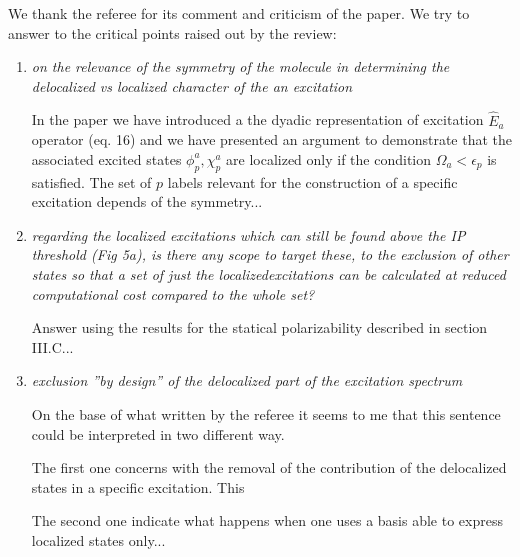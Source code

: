 \documentclass[11pt,a4paper]{article}
\newcommand{\op}[1]{\hat {#1}}
\begin{document}
We thank the referee for its comment and criticism of the paper.
We try to answer to the critical points raised out by the review:

\begin{enumerate}
 \item \emph{on the relevance of the symmetry of the molecule in determining the delocalized vs localized character of the an excitation}
 
 In the paper we have introduced a the dyadic representation of excitation $\op E_a$ operator (eq. 16) and we have presented an argument to
 demonstrate that the associated excited states $\phi_p^a,\chi_p^a$ are localized only if the condition $\Omega_a<\epsilon_p$ is satisfied. 
 The set of $p$ labels relevant for the construction of a specific excitation depends of the symmetry...
 
 
 \item \emph{regarding the localized excitations which can still be found above the IP threshold (Fig 5a), is there any scope to target these, to the exclusion of other states so that a set of just the localizedexcitations can be calculated at reduced computational cost compared to the whole set?}

 
 Answer using the results for the statical polarizability described in section III.C...
 
 \item \emph{exclusion ''by design'' of the delocalized part of the excitation spectrum}
 
 On the base of what written by the referee it seems to me that this sentence could be interpreted in two different way. 
 
 The first one concerns with the removal of the contribution of the delocalized states in a specific excitation. This  
 
 The second one indicate what happens when one uses a basis able to express localized states only...
 
 
 
\end{enumerate}



\end{document}
